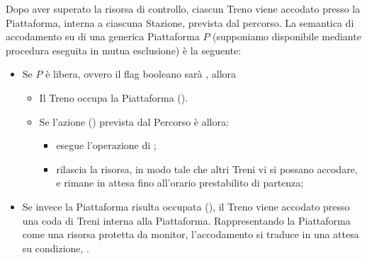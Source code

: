 \begin{description}
		Dopo aver superato la risorsa di controllo, ciascun Treno viene accodato presso la Piattaforma, interna a ciascuna Stazione, prevista dal percorso. La semantica di accodamento su di una generica Piattaforma $P$ (supponiamo disponibile mediante procedura eseguita in mutua esclusione) è la seguente:
		\begin{itemize}
			\item Se $P$ è libera, ovvero il flag booleano  sarà , allora 
				\begin{itemize}
					\item Il Treno occupa la Piattaforma ().
					\item Se l'azione () prevista dal Percorso è  allora:
						\begin{itemize}
							\item esegue l'operazione di ;
							\item rilascia la risorsa, in modo tale che altri Treni vi si possano accodare, e rimane in attesa fino all'orario prestabilito di partenza;
						\end{itemize}
				\end{itemize} 
			\item Se invece la Piattaforma risulta occupata (), il Treno viene accodato presso una coda di Treni interna alla Piattaforma. Rappresentando la Piattaforma come una risorsa protetta da monitor, l'accodamento si traduce in una attesa su condizione, .
		\end{itemize}
			

\end{description}
